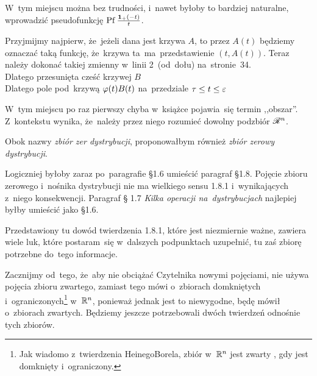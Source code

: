 \documentclass[a4paper,11pt]{article}
\begin{document}
\vspace{\spaceFour}


\start {} W~tym miejscu można bez trudności, i~nawet byłoby to
bardziej naturalne, wprowadzić pseudofunkcję
$\mathrm{Pf}\, \frac{ \mathbf{1}_{ + }( -t )}{ t }$.

\vspace{\spaceFour}


\start {} Przyjmijmy najpierw, że~jeżeli dana jest krzywa
$A$, to przez $A( t )$ będziemy oznaczać taką funkcję, że~krzywa
ta~ma~przedstawienie $( t, A( t ) )$. Teraz należy dokonać takiej
zmienny w~linii 2~(od~dołu) na~stronie~34. \\
\Jest Dlatego przesunięta cześć krzywej $B$ \\
\Pow Dlatego pole pod~krzywą $\varphi( t ) B( t )$ na~przedziale
$\tau \leq t \leq \varepsilon$

\vspace{\spaceFour}


\start {} W~tym miejscu po raz pierwszy chyba w~książce
pojawia~się termin ,,obszar''. Z~kontekstu wynika, że~należy przez
niego rozumieć dowolny podzbiór $\mathcal{R}^{ n }$.

\vspace{\spaceFour}


\start {} Obok nazwy \emph{zbiór zer dystrybucji}, proponowałbym
również \emph{zbiór zerowy dystrybucji}.

\vspace{\spaceFour}


\start {} Logiczniej byłoby zaraz po~paragrafie \S 1.6 umieścić
paragraf \S 1.8. Pojęcie zbioru zerowego i~nośnika dystrybucji nie ma
wielkiego sensu 1.8.1 i~wynikających z~niego konsekwencji. Paragraf \S
1.7 \emph{Kilka operacji na~dystrybucjach} najlepiej byłby umieścić
jako \S 1.6.

\vspace{\spaceFour}


\start {} Przedstawiony tu dowód twierdzenia 1.8.1, które
jest niezmiernie ważne, zawiera wiele luk, które postaram~się
w~dalszych podpunktach uzupełnić, tu zaś zbiorę potrzebne do~tego
informacje.

Zacznijmy od~tego, że~aby nie obciążać Czytelnika nowymi pojęciami,
nie używa pojęcia zbioru zwartego, zamiast tego mówi o~zbiorach
domkniętych i~ograniczonych\footnote{Jak wiadomo z~twierdzenia
  Heinego\dywiz Borela, zbiór w~$\mathbb{R}^{ n }$ jest zwarty \wtw, gdy jest
  domknięty i~ograniczony.} w~$\mathbb{R}^{ n }$, ponieważ jednak jest to
niewygodne, będę mówił o~zbiorach zwartych. Będziemy jeszcze
potrzebowali dwóch twierdzeń odnośnie tych zbiorów.
\end{document}
